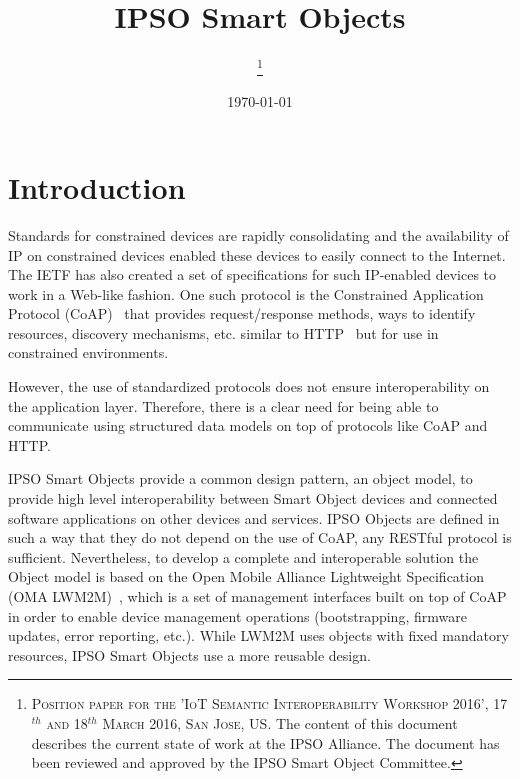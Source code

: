 \documentclass[peerreview, a4paper, 7pt]{IEEEtran}
\begin{document}
\title{IPSO Smart Objects}

\author{
\thanks{\textsc{Position paper for the 'IoT Semantic Interoperability Workshop 2016', 17$^{th}$ and 18$^{th}$ March 2016, San Jose, US.} The content of this document describes the current state of work at the IPSO Alliance. The document has been reviewed and approved by the IPSO Smart Object Committee.}
}

\date{\today}

\maketitle


\section{Introduction}

Standards for constrained devices are rapidly consolidating and the availability of IP on constrained devices enabled these devices to easily connect to the Internet. The IETF has also created a set of specifications for such IP-enabled devices to work in a Web-like fashion. One such protocol is the Constrained Application Protocol (CoAP)~\cite{rfc7252} that provides request/response methods, ways to identify resources, discovery mechanisms, etc. similar to HTTP~\cite{rfc2616} but for use in constrained environments.

However, the use of standardized protocols does not ensure interoperability on the application layer. Therefore, there is a clear need for being able to communicate using structured data models on top of protocols like CoAP and HTTP.

IPSO Smart Objects provide a common design pattern, an object model, to provide high level interoperability between Smart Object devices and connected software applications on other devices and services. IPSO Objects are defined in such a way that they do not depend on the use of CoAP, any RESTful protocol is sufficient. Nevertheless, to develop a complete and interoperable solution the Object model is based on the Open Mobile Alliance Lightweight Specification (OMA LWM2M)~\cite{lwm2m}, which is a set of management interfaces built on top of CoAP in order to enable device management operations (bootstrapping, firmware updates, error reporting, etc.). While LWM2M uses objects with fixed mandatory resources, IPSO Smart Objects use a more reusable design. 
\end{document}
